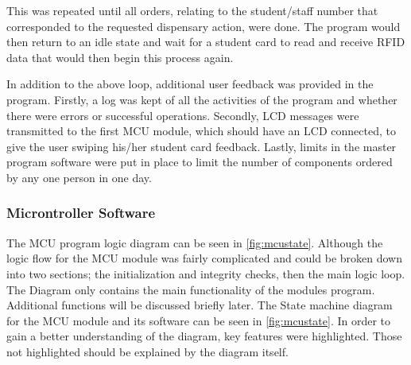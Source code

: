 \documentclass[a4paper,11pt]{article}
\numberwithin{figure}{section}
\numberwithin{table}{section}
\begin{document}
This was repeated until all orders, relating to the student/staff number that corresponded to the requested dispensary action, were done. The program would then return to an idle state and wait for a student card to read and receive RFID data that would then begin this process again.

In addition to the above loop, additional user feedback was provided in the program. Firstly, a log was kept of all the activities of the program and whether there were errors or successful operations. Secondly, LCD messages were transmitted to the first MCU module, which should have an LCD connected, to give the user swiping his/her student card feedback. Lastly, limits in the master program software were put in place to limit the number of components ordered by any one person in one day.

\subsubsection{Microntroller Software}

The MCU program  logic diagram can be seen in \autoref{fig:mcustate}. Although the logic flow for the MCU module was fairly complicated and could be broken down into two sections; the initialization and integrity checks, then the main logic loop. The Diagram only contains the main functionality of the modules program. Additional functions will be discussed briefly later. The State machine diagram for the MCU module and its software can be seen in \autoref{fig:mcustate}. In order to gain a better understanding of the diagram, key features were highlighted. Those not highlighted should be explained by the diagram itself. 
\end{document}
